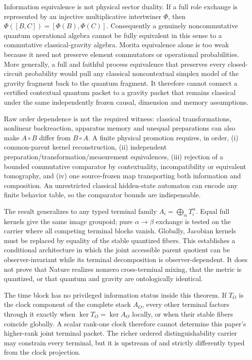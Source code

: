 Information equivalence is not physical sector duality. If a full role
exchange is represented by an injective multiplicative intertwiner $\Phi$,
then $\Phi([B,C])=[\Phi(B),\Phi(C)]$. Consequently a genuinely
noncommutative quantum operational algebra cannot be fully equivalent in this
sense to a commutative classical-gravity algebra. Morita equivalence alone is
too weak because it need not preserve element commutators or operational
probabilities. More generally, a full and faithful process equivalence that
preserves every closed-circuit probability would pull any classical
noncontextual simplex model of the gravity fragment back to the quantum
fragment. It therefore cannot connect a certified contextual quantum packet
to a gravity packet that remains classical under the same independently
frozen causal, dimension and memory assumptions.

Raw order dependence is not the required witness: classical transformations,
nonlinear backreaction, apparatus memory and unequal preparations can also
make $A\circ B$ differ from $B\circ A$. A finite physical promotion requires,
in order, (i) common-parent kernel reconstruction, (ii) independent
preparation/transformation/measurement equivalences, (iii) rejection of a
bounded commutative comparator by contextuality, incompatibility or equivalent
tomography, and (iv) one source-frozen map transporting both information and
composition. An unrestricted classical hidden-state automaton can encode any
finite behavior table, so the comparator bounds are indispensable.

The result generalizes to any typed terminal family
$A_i=\bigoplus_{\alpha}T_i^\alpha$. Equal full kernels give the same image
groupoid; pure $\alpha\to\beta$ exchange is tested on the carrier where all
competing terminal blocks vanish. Globally, Jacobian kernels must be replaced
by equality of the stable quantized fibers. This establishes a conditional
architecture in which the joint accessible parent quotient can be
observer-invariant while its terminal decomposition is observer-dependent.
It does not prove that Nature realizes nonzero cross-terminal mixing, that the
metric is quantized, or that quantum and gravity are ontologically identical.

The time block has no privileged information status inside this theorem. If
$T_O$ is the clock component of the complete stack $A_O$, every other
terminal factors through it exactly when $\ker T_O=\ker A_O$ locally, or when
their stable fibers coincide globally. A scalar rank-one clock therefore
cannot determine this paper's higher-rank joint terminal packet. The richer
ordered distinguishability carrier may constrain every terminal, but it is
upstream of and strictly differently typed from the clock projection.

